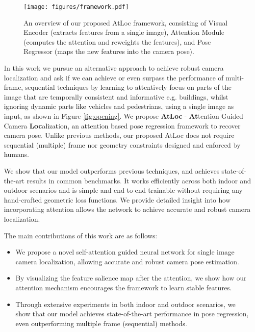 \documentclass[letterpaper]{article}
\begin{document}
 \begin{figure*}[t]
        \centering
        \texttt{[image: figures/framework.pdf]}
        \vspace{-0.5cm}
            \caption{An overview of our proposed AtLoc framework, consisting of Visual Encoder (extracts features from a single image), Attention Module (computes the attention and reweights the features), and Pose Regressor (maps the new features into the camera pose).}    
        \label{fig:framework}
        \vspace{-0.5cm}
\end{figure*}

In this work we pursue an alternative approach to achieve robust camera localization and ask if we can achieve or even surpass the performance of multi-frame, sequential techniques by learning to attentively focus on parts of the image that are temporally consistent and informative e.g. buildings, whilst ignoring dynamic parts like vehicles and pedestrians, using a single image as input, as shown in Figure \ref{fig:opening}. We propose \textbf{AtLoc} - \textbf{At}tention Guided Camera \textbf{Loc}alization, an attention based pose regression framework to recover camera pose. Unlike previous methods, our proposed AtLoc does not require sequential (multiple) frame nor geometry constraints designed and enforced by humans. 

We show that our model outperforms previous techniques, and achieves state-of-the-art results in common benchmarks. It works efficiently across both indoor and outdoor scenarios and is simple and end-to-end trainable without requiring any hand-crafted geometric loss functions. We provide detailed insight into how incorporating attention allows the network to achieve accurate and robust camera localization.







The main contributions of this work are as follows:
\begin{itemize}
    \item We propose a novel self-attention guided neural network for single image camera localization, allowing accurate and robust camera pose estimation.
    \item By visualizing the feature salience map after the attention, we show how our attention mechanism encourages the framework to learn stable features.
    \item Through extensive experiments in both indoor and outdoor scenarios, we show that our model achieves state-of-the-art performance in pose regression, even outperforming multiple frame (sequential) methods.
\end{itemize}
\end{document}
